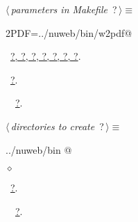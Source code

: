 \documentclass[twoside]{artikel3}
\renewcommand{\NWlink}[2]{\hyperlink{#1}{#2}}
\renewcommand{\NWtarget}[2]{\hypertarget{#1}{#2}}
\renewcommand{\NWsep}{$\diamond$\rule[-1\baselineskip]{0pt}{1\baselineskip}}
\renewcommand{\NWlink}[2]{\hyperlink{#1}{#2}}
\renewcommand{\NWtarget}[2]{\hypertarget{#1}{#2}}
\begin{document}
\begin{flushleft} \small
\begin{minipage}{\linewidth}\label{scrap19}\raggedright\small
\NWtarget{nuweb?}{} $\langle\,${\itshape parameters in Makefile}\nobreak\ {\footnotesize {?}}$\,\rangle\equiv$
\vspace{-1ex}
\begin{list}{}{} \item
\mbox{}\verb@W2PDF=../nuweb/bin/w2pdf@\\
\mbox{}\verb@@{\NWsep}
\end{list}
\vspace{-1.5ex}
\footnotesize
\begin{list}{}{\setlength{\itemsep}{-\parsep}\setlength{\itemindent}{-\leftmargin}}
\item \NWtxtMacroDefBy\ \NWlink{nuweb?}{?}\NWlink{nuweb?}{, ?}\NWlink{nuweb?}{, ?}\NWlink{nuweb?}{, ?}\NWlink{nuweb?}{, ?}\NWlink{nuweb?}{, ?}\NWlink{nuweb?}{, ?}.
\item \NWtxtMacroRefIn\ \NWlink{nuweb?}{?}.
\item \NWtxtIdentsUsed\nobreak\  \verb@nuweb@\nobreak\ \NWlink{nuweb?}{?}.
\item{}
\end{list}
\end{minipage}\vspace{4ex}
\end{flushleft}
\begin{flushleft} \small
\begin{minipage}{\linewidth}\label{scrap20}\raggedright\small
\NWtarget{nuweb?}{} $\langle\,${\itshape directories to create}\nobreak\ {\footnotesize {?}}$\,\rangle\equiv$
\vspace{-1ex}
\begin{list}{}{} \item
\mbox{}\verb@../nuweb/bin @{\NWsep}
\end{list}
\vspace{-1.5ex}
\footnotesize
\begin{list}{}{\setlength{\itemsep}{-\parsep}\setlength{\itemindent}{-\leftmargin}}
\item \NWtxtMacroRefIn\ \NWlink{nuweb?}{?}.
\item \NWtxtIdentsUsed\nobreak\  \verb@nuweb@\nobreak\ \NWlink{nuweb?}{?}.
\item{}
\end{list}
\end{minipage}\vspace{4ex}
\end{flushleft}
\end{document}
